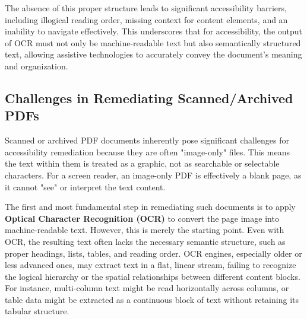 The absence of this proper structure leads to significant accessibility barriers, including illogical reading order, missing context for content elements, and an inability to navigate effectively. This underscores that for accessibility, the output of OCR must not only be machine-readable text but also semantically structured text, allowing assistive technologies to accurately convey the document's meaning and organization.

\subsection{Challenges in Remediating Scanned/Archived PDFs}

Scanned or archived PDF documents inherently pose significant challenges for accessibility remediation because they are often "image-only" files. This means the text within them is treated as a graphic, not as searchable or selectable characters. For a screen reader, an image-only PDF is effectively a blank page, as it cannot "see" or interpret the text content.

The first and most fundamental step in remediating such documents is to apply \textbf{Optical Character Recognition (OCR)} to convert the page image into machine-readable text. However, this is merely the starting point. Even with OCR, the resulting text often lacks the necessary semantic structure, such as proper headings, lists, tables, and reading order. OCR engines, especially older or less advanced ones, may extract text in a flat, linear stream, failing to recognize the logical hierarchy or the spatial relationships between different content blocks. For instance, multi-column text might be read horizontally across columns, or table data might be extracted as a continuous block of text without retaining its tabular structure.

